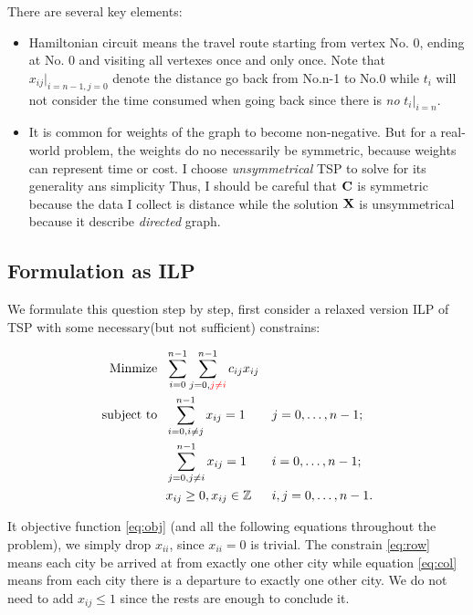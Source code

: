 \documentclass{mcmthesis}
\begin{document}
There are several key elements:
\begin{itemize}
	\item Hamiltonian circuit means the travel route starting from vertex No. 0, ending at No. 0 and visiting all vertexes once and only once. Note that $x_{ij}|_{i=n-1,j=0}$ denote the distance  go back from No.n-1 to No.0 while  $t_i$ will not consider the time consumed when going back since there is \textit{no} $t_i|_{i=n}$.
	\item It is common for weights of the graph to become non-negative. But for a real-world problem, the weights do no necessarily be symmetric, because weights can represent time or cost. I choose \textit{unsymmetrical}  TSP to solve for its generality ans simplicity Thus, I should be careful that $\mathbf{C}$ is symmetric because the data I collect is distance while the solution $\mathbf{X}$ is unsymmetrical because it describe \textit{directed} graph.
\end{itemize} 

\subsection{Formulation as ILP }
We formulate this question step by step, first consider a relaxed version ILP of TSP with some necessary(but not sufficient) constrains:

\begin{align}
\mathop{\mathrm{Minmize \ \  }}       & \sum _{i=0}^{n-1}\sum _{j=0,{\color{Red} j\neq i}}^{n-1}c_{ij}x_{ij} &  & \label{eq:obj}          \\
\mathop{\mathrm{subject \  to \ \  }} & \sum _{i=0,i\neq j}^{n-1}x_{ij}=1                          &  & j=0,\ldots ,n-1;   \label{eq:row}       \\
& \sum _{j=0,j\neq i}^{n-1}x_{ij}=1                          &  & i=0,\ldots ,n-1;         \label{eq:col} \\
& x_{ij} \geq 0, x_{ij} \in \Zbb                                           &  & i,j=0,\ldots ,n-1. \notag
\end{align}

It objective function \eqref{eq:obj} (and all the following  equations  throughout the problem), we simply drop $x_{ii}$, since $x_{ii}=0$ is trivial. The constrain \eqref{eq:row} means each city be arrived at from exactly one other city while equation \eqref{eq:col} means from each city there is a departure to exactly one other city. We do not need to add $x_{ij} \le 1 $ since the rests are enough to conclude it. 
\end{document}
